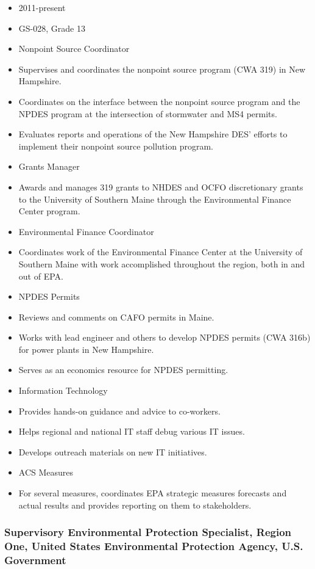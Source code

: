 \documentclass[12pt]{article}
\begin{document}
\begin{itemize}
\item
  2011-present
\item
  GS-028, Grade 13
\item
  Nonpoint Source Coordinator
\item
  Supervises and coordinates the nonpoint source program (CWA 319) in
  New Hampshire.
\item
  Coordinates on the interface between the nonpoint source program and
  the NPDES program at the intersection of stormwater and MS4 permits.
\item
  Evaluates reports and operations of the New Hampshire DES' efforts to
  implement their nonpoint source pollution program.
\item
  Grants Manager
\item
  Awards and manages 319 grants to NHDES and OCFO discretionary grants
  to the University of Southern Maine through the Environmental Finance
  Center program.
\item
  Environmental Finance Coordinator
\item
  Coordinates work of the Environmental Finance Center at the University
  of Southern Maine with work accomplished throughout the region, both
  in and out of EPA.
\item
  NPDES Permits
\item
  Reviews and comments on CAFO permits in Maine.
\item
  Works with lead engineer and others to develop NPDES permits (CWA
  316b) for power plants in New Hampshire.
\item
  Serves as an economics resource for NPDES permitting.
\item
  Information Technology
\item
  Provides hands-on guidance and advice to co-workers.
\item
  Helps regional and national IT staff debug various IT issues.
\item
  Develops outreach materials on new IT initiatives.
\item
  ACS Measures
\item
  For several measures, coordinates EPA strategic measures forecasts and
  actual results and provides reporting on them to stakeholders.
\end{itemize}

\subsubsection{Supervisory Environmental Protection Specialist, Region One, United States Environmental Protection Agency, U.S. Government}
\end{document}

